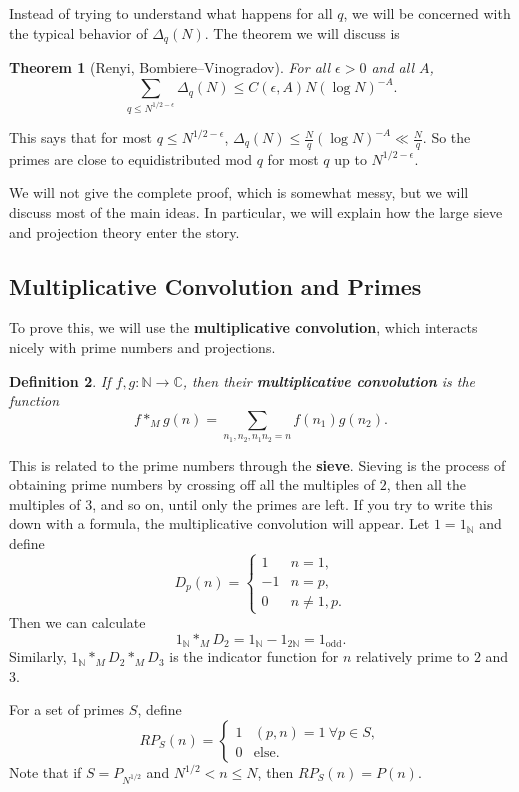 \documentclass[12pt]{amsart}
\newtheorem{theorem}{Theorem}[section]
\newtheorem{Definition}[theorem]{Definition}
\begin{document}
Instead of trying to understand what happens for all $q$, we will be concerned with the typical behavior of $\Delta_q(N)$. The theorem we will discuss is
\begin{theorem}[Renyi, Bombiere--Vinogradov]
    For all $\epsilon > 0$ and all $A$,
    \[
        \sum_{q \leq N^{1/2 - \epsilon}} \Delta_q(N) \leq C(\epsilon, A) N (\log N)^{-A}.
    \]
\end{theorem}
This says that for most $q \leq N^{1/2 - \epsilon}$, $\Delta_q(N) \leq \frac{N}{q} (\log N)^{-A} \ll \frac{N}{q}$. So the primes are close to equidistributed mod $q$ for most $q$ up to $N^{1/2 - \epsilon}$.

We will not give the complete proof,  which is somewhat messy, but we will discuss most of the main ideas.   In particular,  we will explain how the large sieve and projection theory enter the story.

\subsection{Multiplicative Convolution and Primes}
To prove this, we will use the \textbf{multiplicative convolution}, which interacts nicely with prime numbers and projections.
\begin{Definition}
    If $f, g : \mathbb{N} \to \mathbb{C}$, then their \textbf{multiplicative convolution} is the function
    \[
        f *_M g(n) = \sum_{n_1, n_2, n_1n_2 = n} f(n_1) g(n_2).
    \]
\end{Definition}
This is related to the prime numbers through the \textbf{sieve}. Sieving is the process of obtaining prime numbers by crossing off all the multiples of $2$, then all the multiples of $3$, and so on, until only the primes are left. If you try to write this down with a formula, the multiplicative convolution will appear. Let $1 = 1_{\mathbb{N}}$ and define
\[
    D_p(n) =
    \begin{cases}
        1 & n = 1, \\
        -1 & n = p, \\
        0 & n \neq 1, p.
    \end{cases}
\]
Then we can calculate
\[
    1_{\mathbb{N}} *_M D_2 = 1_{\mathbb{N}} - 1_{2\mathbb{N}} = 1_{\mathrm{odd}}.
\]
Similarly, $1_{\mathbb{N}} *_M D_2 *_M D_3$ is the indicator function for $n$ relatively prime to $2$ and $3$.

For a set of primes $S$, define
\[
    RP_S(n) =
    \begin{cases}
        1 & (p, n) = 1 \ \forall p \in S, \\
        0 & \text{else}.
    \end{cases}
\]
Note that if $S = P_{N^{1/2}}$ and $N^{1/2} < n \leq N$, then $RP_S(n) = P(n)$.
\end{document}
